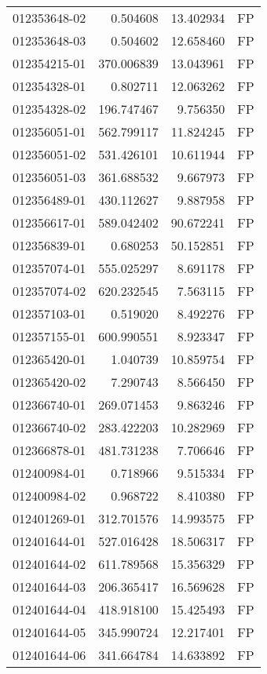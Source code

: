 \begin{tabular}{lrrl}
012353648-02 &    0.504608 &    13.402934 &   FP \\
012353648-03 &    0.504602 &    12.658460 &   FP \\
012354215-01 &  370.006839 &    13.043961 &   FP \\
012354328-01 &    0.802711 &    12.063262 &   FP \\
012354328-02 &  196.747467 &     9.756350 &   FP \\
012356051-01 &  562.799117 &    11.824245 &   FP \\
012356051-02 &  531.426101 &    10.611944 &   FP \\
012356051-03 &  361.688532 &     9.667973 &   FP \\
012356489-01 &  430.112627 &     9.887958 &   FP \\
012356617-01 &  589.042402 &    90.672241 &   FP \\
012356839-01 &    0.680253 &    50.152851 &   FP \\
012357074-01 &  555.025297 &     8.691178 &   FP \\
012357074-02 &  620.232545 &     7.563115 &   FP \\
012357103-01 &    0.519020 &     8.492276 &   FP \\
012357155-01 &  600.990551 &     8.923347 &   FP \\
012365420-01 &    1.040739 &    10.859754 &   FP \\
012365420-02 &    7.290743 &     8.566450 &   FP \\
012366740-01 &  269.071453 &     9.863246 &   FP \\
012366740-02 &  283.422203 &    10.282969 &   FP \\
012366878-01 &  481.731238 &     7.706646 &   FP \\
012400984-01 &    0.718966 &     9.515334 &   FP \\
012400984-02 &    0.968722 &     8.410380 &   FP \\
012401269-01 &  312.701576 &    14.993575 &   FP \\
012401644-01 &  527.016428 &    18.506317 &   FP \\
012401644-02 &  611.789568 &    15.356329 &   FP \\
012401644-03 &  206.365417 &    16.569628 &   FP \\
012401644-04 &  418.918100 &    15.425493 &   FP \\
012401644-05 &  345.990724 &    12.217401 &   FP \\
012401644-06 &  341.664784 &    14.633892 &   FP \\

\end{tabular}
